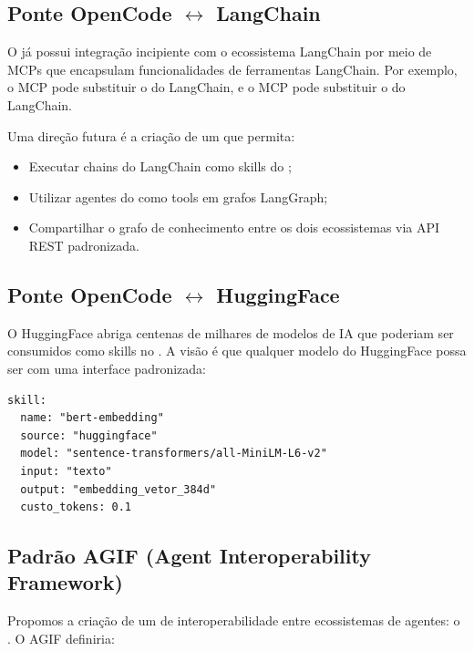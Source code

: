 \subsection{Ponte OpenCode $\leftrightarrow$ LangChain}

O \opencodeeco{} já possui integração incipiente com o ecossistema
LangChain por meio de MCPs que encapsulam funcionalidades de
ferramentas LangChain. Por exemplo, o MCP  pode
substituir o  do LangChain, e o MCP
 pode substituir o  do LangChain.

Uma direção futura é a criação de um 
que permita:

\begin{itemize}
    \item Executar chains do LangChain como skills do \opencodeeco{};
    \item Utilizar agentes do \opencodeeco{} como tools em grafos
    LangGraph;
    \item Compartilhar o grafo de conhecimento entre os dois
    ecossistemas via API REST padronizada.
\end{itemize}

\subsection{Ponte OpenCode $\leftrightarrow$ HuggingFace}

O HuggingFace abriga centenas de milhares de modelos de IA que
poderiam ser consumidos como skills no \opencodeeco{}. A visão é
que qualquer modelo do HuggingFace possa ser  com uma interface padronizada:

\begin{verbatim}
skill:
  name: "bert-embedding"
  source: "huggingface"
  model: "sentence-transformers/all-MiniLM-L6-v2"
  input: "texto"
  output: "embedding_vetor_384d"
  custo_tokens: 0.1
\end{verbatim}

\subsection{Padrão AGIF (Agent Interoperability Framework)}

Propomos a criação de um  de interoperabilidade
entre ecossistemas de agentes: o . O AGIF definiria:

